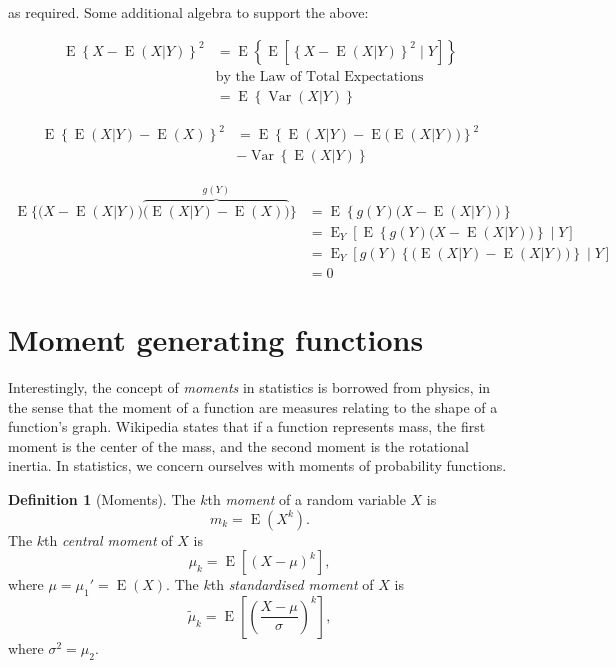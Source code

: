 \documentclass[
]{book}
\DeclareMathOperator{\E}{E}
\DeclareMathOperator{\Var}{Var}
\theoremstyle{definition}
\newtheorem{definition}{Definition}[chapter]
\theoremstyle{definition}
\theoremstyle{definition}
\theoremstyle{definition}
\theoremstyle{remark}
\begin{document}
as required.
Some additional algebra to support the above:

\begin{align*}
\E\left\{X - \E(X|Y)\right\}^2 
&=\E\left\{\E\left[\left\{X - \E(X|Y)\right\}^2 \mid Y \right]\right\}\\
&\text{by the Law of Total Expectations} \\
&= \E\left\{\Var(X|Y) \right\}
\end{align*}

\begin{align*}
\E\left\{\E(X|Y) - \E(X) \right\}^2
&= \E\left\{\E(X|Y) - \E\big(\E(X|Y)\big) \right\}^2 \\
&- \Var\left\{ \E(X|Y) \right\}
\end{align*}

\begin{align*}
\E \bigg\{\big(X - \E(X|Y)\big) \overbrace{\big(\E(X|Y) - \E(X)\big)}^{g(Y)} \bigg\} 
&= \E\left\{g(Y) \big(X - \E(X|Y)\big) \right\}\\ 
&= \E_Y \left[ \E\left\{g(Y) \big(X - \E(X|Y)\big) \right\} \mid Y \right] \\
&= \E_Y \left[ g(Y) \left\{ \big(\E(X|Y) - \E(X|Y)\big) \right\} \mid Y \right] \\
&= 0
\end{align*}

\hypertarget{moment-generating-functions}{%
\section{Moment generating functions}\label{moment-generating-functions}}

Interestingly, the concept of \emph{moments} in statistics is borrowed from physics, in the sense that the moment of a function are measures relating to the shape of a function's graph.
Wikipedia states that if a function represents mass, the first moment is the center of the mass, and the second moment is the rotational inertia.
In statistics, we concern ourselves with moments of probability functions.

\begin{definition}[Moments]
The \(k\)th \emph{moment} of a random variable \(X\) is
\[
m_k = \E(X^k).
\]
The \(k\)th \emph{central moment} of \(X\) is
\[
\mu_k = \E\left[(X-\mu)^k \right],
\]
where \(\mu=\mu_1'=\E(X)\).
The \(k\)th \emph{standardised moment} of \(X\) is
\[
\tilde\mu_k = \E\left[\left(\frac{X-\mu}{\sigma}\right)^k \right],
\]
where \(\sigma^2 = \mu_2\).
\end{definition}
\end{document}
